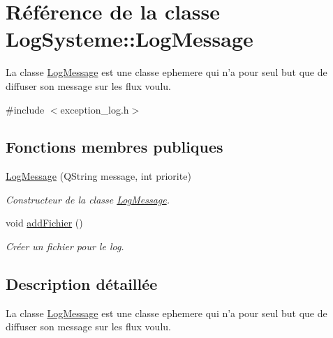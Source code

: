 \hypertarget{class_log_systeme_1_1_log_message}{\section{Référence de la classe Log\-Systeme\-:\-:Log\-Message}
\label{class_log_systeme_1_1_log_message}
}


La classe \hyperlink{class_log_systeme_1_1_log_message}{Log\-Message} est une classe ephemere qui n'a pour seul but que de diffuser son message sur les flux voulu.  




{\ttfamily \#include $<$exception\-\_\-log.\-h$>$}

\subsection*{Fonctions membres publiques}
\begin{DoxyCompactItemize}
\item 
\hyperlink{class_log_systeme_1_1_log_message_a0471a9f3e5824be53ba38a7bab8a4dd6}{Log\-Message} (Q\-String message, int priorite)
\begin{DoxyCompactList}\small\item\em Constructeur de la classe \hyperlink{class_log_systeme_1_1_log_message}{Log\-Message}. \end{DoxyCompactList}\item 
\hypertarget{class_log_systeme_1_1_log_message_a75f3cd2c8d73b2584790a8db3aa31574}{void \hyperlink{class_log_systeme_1_1_log_message_a75f3cd2c8d73b2584790a8db3aa31574}{add\-Fichier} ()}\label{class_log_systeme_1_1_log_message_a75f3cd2c8d73b2584790a8db3aa31574}

\begin{DoxyCompactList}\small\item\em Créer un fichier pour le log. \end{DoxyCompactList}\end{DoxyCompactItemize}


\subsection{Description détaillée}
La classe \hyperlink{class_log_systeme_1_1_log_message}{Log\-Message} est une classe ephemere qui n'a pour seul but que de diffuser son message sur les flux voulu. 

